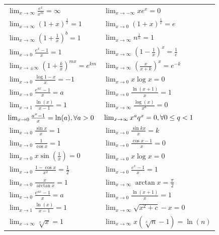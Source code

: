 \documentclass[a4paper,10pt]{article}
\def\limxo{\lim_{x\to 0}}
\def\limxi{\lim_{x\to\infty}}
\def\limxn{\lim_{x\to-\infty}}
\begin{document}
\begin{center}
	\begin{tabularx}{\linewidth}{XX}
		\toprule
		$\limxi \frac{e^x}{x^m} = \infty$                          & $\limxn xe^x = 0$                        \\
		$\limxi (1+x)^{\frac{1}{x}} = 1$                           & $\limxo (1+x)^{\frac{1}{x}} = e$         \\
		$\limxi (1+\frac{1}{x})^b = 1$                             & $\limxi n^{\frac{1}{n}} = 1$             \\
		$\limxo \frac{e^x-1}{x} = 1$                               & $\limxi (1-\frac{1}{x})^x = \frac{1}{e}$ \\
		$\lim_{x\to\pm\infty} (1 + \frac{k}{x})^{mx} = e^{km}$     & $\limxi (\frac{x}{x+k})^x = e^{-k}$      \\
		$\limxo \frac{\log 1 - x}{x} = -1$                         & $\limxo x \log x = 0$                    \\
		$\limxo \frac{e^{ax}-1}{x} = a$                            & $\limxo \frac{\ln(x+1)}{x} = 1$          \\
		$\lim_{x\to 1} \frac{\ln(x)}{x-1} = 1$                     & $\limxi \frac{\log(x)}{x^a} = 0$         \\
		$\limxo \frac{a^x -1}{x} = \ln(a), \newline \forall a > 0$ &
		$\limxi x^a q^x = 0, \newline \forall 0 \le q < 1$                                                    \\
		$\limxo \frac{\sin x}{x} = 1$                              & $\limxo \frac{\sin kx}{x} = k$           \\
		$\limxo \frac{1}{\cos x} = 1$                              & $\limxo \frac{\cos x -1}{x} = 0$         \\
		$\limxo x \sin(\frac{1}{x}) = 0$                           & $\limxo x \log x = 0$                    \\
		$\limxo \frac{1 - \cos x}{x^2} = \frac{1}{2}$              & $\limxo \frac{e^x-1}{x} = 1$             \\
		$\limxo \frac{x}{\arctan x} = 1$                           & $\limxi \arctan x = \frac{\pi}{2}$       \\
		$\limxo \frac{e^{ax}-1}{x} = a$                            & $\limxo \frac{\ln(x+1)}{x} = 1$          \\
		$\lim_{x\to 1} \frac{\ln(x)}{x-1} = 1$                     & $\limxi \sqrt{x^2 + c} - x = 0$          \\
		$\limxi \sqrt[x]{x} = 1$                                   & $\limxi x(\sqrt[x]{n} - 1) = \ln(n)$     \\
		\bottomrule
	\end{tabularx}
\end{center}
\end{document}
